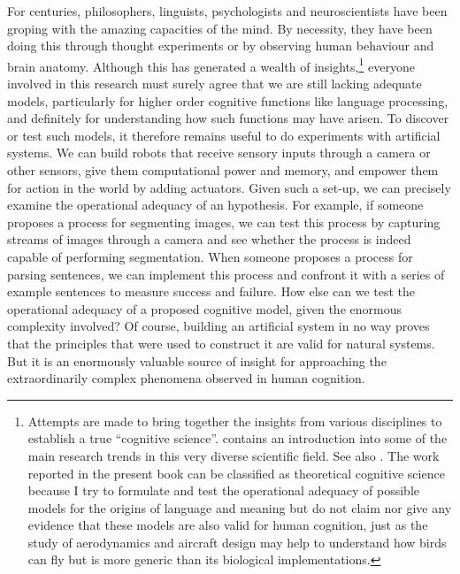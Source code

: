 For centuries, philosophers, linguists, psychologists and 
neuroscientists have been groping with the amazing capacities
of the mind. By necessity, they have been doing this through
thought experiments or by observing human behaviour and
brain anatomy. Although this has generated a wealth
of insights,\footnote{Attempts are made to bring together the insights from various
disciplines to establish a true ``cognitive science''. 
\cite{Osherton:1995} contains an introduction into some of the main 
research trends in this very diverse scientific field. 
See also \cite{Luger:1994}. The work reported in the present book can be 
classified as theoretical
cognitive science because I try to formulate and test
the operational adequacy of possible models for the 
origins of language and meaning but do not claim nor
give any evidence that these models are also valid for
human cognition, just as the study of aerodynamics and 
aircraft design may help to understand how birds can 
fly but is more generic than its biological 
implementations.}
everyone involved in this research must surely 
agree that we are still lacking adequate models, 
particularly for higher order cognitive functions like language
processing, and definitely for understanding how such 
functions may have arisen. 
To discover or test such models, it therefore
remains useful to do experiments with artificial systems.
We can build robots that receive sensory inputs
through a camera or other sensors, give them computational 
power and memory, and empower them 
for action in the world by adding actuators. Given such a 
set-up, we can precisely examine the operational adequacy 
of an hypothesis. For example, if someone proposes
a process for segmenting images, we can test this process 
by capturing streams of images through a camera and 
see whether the process is indeed capable of performing 
segmentation. When someone proposes a process 
for parsing sentences, we 
can implement this process and confront it with a series of 
example sentences to measure success and failure. 
How else can we test the operational adequacy of a proposed
cognitive model, given the enormous complexity involved? 
Of course, building an artificial system in no way proves
that the principles that were used to construct it are valid
for natural systems. But it is an enormously valuable 
source of insight for approaching the extraordinarily 
complex phenomena observed in human cognition. 


